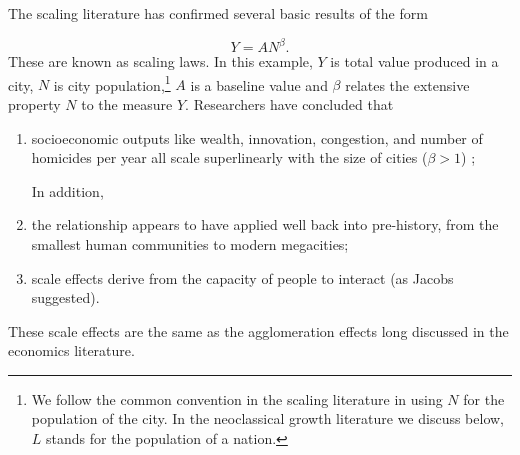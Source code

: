 The scaling literature has confirmed several basic results of the form 

\begin{equation}
Y=AN^\beta.
\end{equation} 
These are known as \glspl{scaling law}. In this example, $Y$ is total value produced in a city, $N$ is city population,\footnote{We follow the common convention in the scaling literature  in using $N$ for the population of the city. In the neoclassical growth literature we discuss below, $L$ stands for the population of a nation.} $A$ is a baseline value and $\beta$ relates the \gls{extensive property} $N$ to the measure $Y$. Researchers have concluded that 

\begin{enumerate}
 \item socioeconomic outputs like wealth, innovation, congestion, and number of homicides per year all scale superlinearly with the size of cities ($\beta > 1$) \cite{gomez-lievanoStatisticsUrbanScaling2012};
\vspace{.25cm}
 

 \hspace{-1cm}In addition, 
\item the relationship appears to have applied well back into pre-history, from the smallest human communities to modern megacities; %
\item scale effects derive from the capacity of people to interact (as Jacobs suggested).
\end{enumerate}
These scale effects are the same as the agglomeration effects long discussed in the economics literature.



